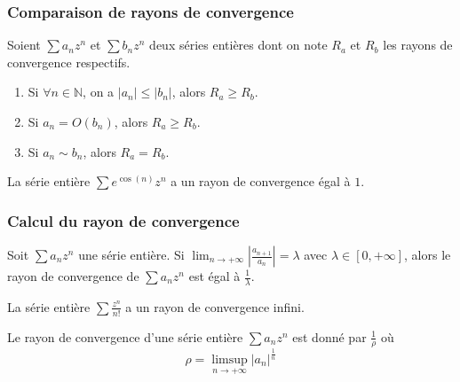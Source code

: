 	\subsubsection{Comparaison de rayons de convergence}


	Soient $\sum a_n z^n$ et $\sum b_n z^n$ deux séries entières dont on note $R_a$ et $R_b$ les rayons de convergence respectifs.

	\begin{proposition}
		\begin{enumerate}[label=(\roman*)]
			\item Si $\forall n \in \mathbb{N}$, on a $|a_n| \leq |b_n|$, alors $R_a \geq R_b$.
			\item Si $a_n = O(b_n)$, alors $R_a \geq R_b$.
			\item Si $a_n \sim b_n$, alors $R_a = R_b$.
		\end{enumerate}
	\end{proposition}

	\begin{example}
		La série entière $\sum e^{\cos(n)} z^n$ a un rayon de convergence égal à $1$.
	\end{example}

	\subsubsection{Calcul du rayon de convergence}

	\reference{233}

	\begin{proposition}
		Soit $\sum a_n z^n$ une série entière. Si $\lim_{n \rightarrow +\infty} \left| \frac{a_{n+1}}{a_n} \right| = \lambda$ avec $\lambda \in [0, +\infty]$, alors le rayon de convergence de $\sum a_n z^n$ est égal à $\frac{1}{\lambda}$.
	\end{proposition}

	\begin{example}
		La série entière $\sum \frac{z^n}{n!}$ a un rayon de convergence infini.
	\end{example}

	\begin{proposition}
		Le rayon de convergence d'une série entière $\sum a_n z^n$ est donné par $\frac{1}{\rho}$ où
		\[ \rho = \limsup_{n \rightarrow +\infty} |a_n|^{\frac{1}{n}} \]
	\end{proposition}

